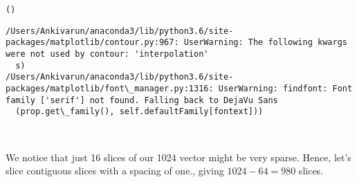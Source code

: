 \documentclass[11pt]{article}
\begin{document}
    \begin{Verbatim}[commandchars=\\\{\}]
()

    \end{Verbatim}

    \begin{Verbatim}[commandchars=\\\{\}]
/Users/Ankivarun/anaconda3/lib/python3.6/site-packages/matplotlib/contour.py:967: UserWarning: The following kwargs were not used by contour: 'interpolation'
  s)
/Users/Ankivarun/anaconda3/lib/python3.6/site-packages/matplotlib/font\_manager.py:1316: UserWarning: findfont: Font family ['serif'] not found. Falling back to DejaVu Sans
  (prop.get\_family(), self.defaultFamily[fontext]))

    \end{Verbatim}

    \begin{center}
    \end{center}
    { \hspace*{\fill} \\}
    
    We notice that just 16 slices of our 1024 vector might be very sparse.
Hence, let's slice contiguous slices with a spacing of one., giving
\(1024-64=980\) slices.
\end{document}
